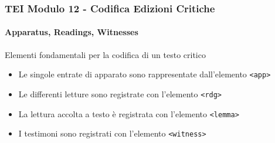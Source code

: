 \begin{frame}
    \frametitle{TEI Modulo 12 - Codifica Edizioni Critiche}
    \framesubtitle{Apparatus, Readings, Witnesses}
    \addtocounter{nframe}{1}











    \begin{block}{Elementi fondamentali per la codifica di un testo critico}
        \begin{itemize}
            \item Le singole entrate di apparato sono rappresentate dall'elemento \texttt{<app>}
            \item Le differenti letture sono registrate con l'elemento \texttt{<rdg>}
            \item La lettura accolta a testo è registrata con l'elemento \texttt{<lemma>}
            \item I testimoni sono registrati con l'elemento \texttt{<witness>}
        \end{itemize}
       
    \end{block}


\end{frame}


